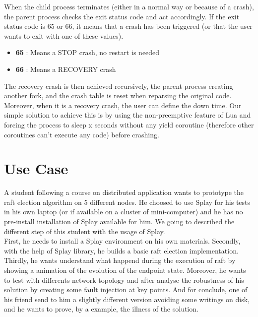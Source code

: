 \documentclass{eplmastersthesis}
\begin{document}
          When the child process terminates (either in a normal way or because
          of a crash), the parent process checks the exit status code and act
          accordingly. If the exit status code is 65 or 66, it means that a
          crash has been triggered (or that the user wants to exit
          with one of these values).

          \begin{itemize}
            \item \textbf{65} : Means a STOP crash, no restart is needed
            \item \textbf{66} : Means a RECOVERY crash
          \end{itemize}

          The recovery crash is then achieved recursively, the parent process
          creating another fork, and the crash table is reset when reparsing
          the original code. Moreover, when it is a recovery crash, the user
          can define the down time. Our simple solution to achieve this is by
          using the non-preemptive feature of Lua and forcing the process
          to sleep x seconds without any yield coroutine (therefore other
          coroutines can't execute any code) before crashing.

    \chapter{Use Case} %
      A student following a course on distributed application wants to prototype the raft election algorithm
      on 5 different nodes. He choosed to use Splay for his tests in his own laptop (or if available on a cluster of mini-computer)
      and he has no pre-install installation of Splay available for him. We going to described the different
      step of this student with the usage of Splay. \\

      First, he needs to install a Splay environment on his own materials.
      Secondly, with the help of Splay library, he builds a basic raft election implementation.
      Thirdly, he wants understand what happend during the execution of raft by showing a animation of the evolution of the endpoint state.
      Moreover, he wants to test with differents network topology and after analyse the robustness of his solution by creating
      some fault injection at key points. And for conclude, one of his friend send to him a slightly different version
      avoiding some writings on disk, and he wants to prove, by a example, the illness of the solution.
\end{document}

